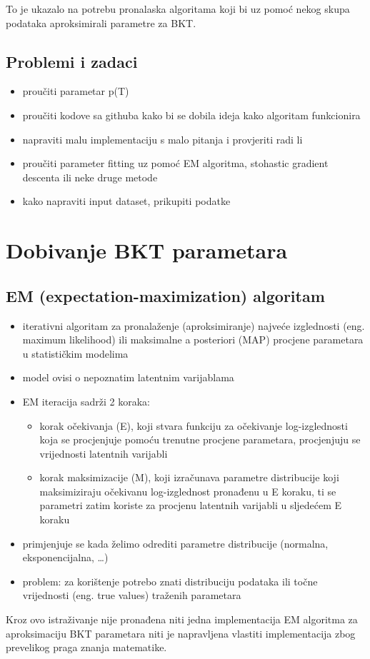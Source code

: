 \documentclass[utf8]{report}
\begin{document}
		To je ukazalo na potrebu pronalaska algoritama koji bi uz pomoć nekog skupa podataka aproksimirali parametre za BKT.
	\section{Problemi i zadaci}
	\begin{itemize}
		\item proučiti parametar p(T)
		\item proučiti kodove sa githuba kako bi se dobila ideja kako algoritam funkcionira
		\item napraviti malu implementaciju s malo pitanja i provjeriti radi li
		\item proučiti parameter fitting uz pomoć EM algoritma, stohastic gradient descenta ili neke druge metode
		\item kako napraviti input dataset, prikupiti podatke
		
	
	\end{itemize}
	\chapter{Dobivanje BKT parametara}
	\section{EM (expectation-maximization) algoritam}
		\begin{itemize}
			\item iterativni algoritam za pronalaženje (aproksimiranje) najveće izglednosti (eng. maximum likelihood) ili maksimalne a posteriori (MAP) procjene parametara u statističkim modelima
			\item model ovisi o nepoznatim latentnim varijablama
			\item EM iteracija sadrži 2 koraka:
				\begin{itemize}
					\item 	korak očekivanja (E), koji stvara funkciju za očekivanje log-izglednosti koja se procjenjuje pomoću trenutne procjene parametara, procjenjuju se vrijednosti latentnih varijabli
					\item 	korak maksimizacije (M), koji izračunava parametre distribucije koji maksimiziraju očekivanu log-izglednost pronađenu u E koraku, ti se parametri zatim koriste za procjenu latentnih varijabli u sljedećem E koraku
				\end{itemize}
			
			\item primjenjuje se kada želimo odrediti parametre distribucije (normalna, eksponencijalna, …)
			\item problem: za korištenje potrebo znati distribuciju podataka ili točne vrijednosti (eng. true values) traženih parametara
			
		\end{itemize}
	Kroz ovo istraživanje nije pronađena niti jedna implementacija EM algoritma za aproksimaciju BKT parametara niti je napravljena vlastiti implementacija zbog prevelikog praga znanja matematike.
	
\end{document}
